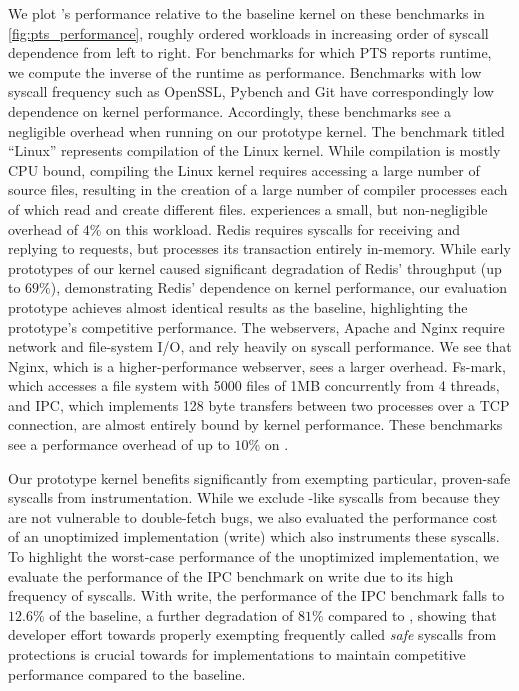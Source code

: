 \documentclass[letterpaper,twocolumn,10pt, anonymous]{article}
\begin{document}
We plot \tiktok's performance relative to the baseline kernel on
these benchmarks in \autoref{fig:pts_performance}, roughly ordered 
workloads in increasing order of syscall dependence from left to right.
For benchmarks for which PTS reports runtime, we compute the inverse 
of the runtime as performance.
Benchmarks with low syscall frequency such as OpenSSL, 
Pybench and Git have correspondingly low dependence on kernel performance.
Accordingly, these benchmarks see a negligible overhead when running 
on our prototype kernel.
The benchmark titled ``Linux'' represents compilation of the Linux kernel.
While compilation is mostly CPU bound, compiling the Linux kernel requires 
accessing a large number of source files, resulting in the creation 
of a large number of compiler processes each of which read and create 
different files. 
\tiktok experiences a small, but non-negligible overhead of $4\%$ on this workload.
Redis requires syscalls for receiving and replying to requests, but 
processes its transaction entirely in-memory. 
While early prototypes of our kernel caused significant degradation
of Redis' throughput (up to $69\%$), demonstrating Redis' dependence 
on kernel performance, 
our evaluation prototype achieves almost identical results as the baseline, 
highlighting the prototype's competitive performance.
The webservers, Apache and Nginx require network and file-system I/O, 
and rely heavily on syscall performance. 
We see that Nginx, which is a higher-performance webserver, sees a larger
overhead.
Fs-mark, which accesses a file system with 5000 files of 1MB concurrently
from 4 threads, and IPC, which implements 128 byte transfers between 
two processes over a TCP connection, are almost entirely bound by kernel 
performance. 
These benchmarks see a performance overhead of up to $10\%$ on \tiktok.

Our prototype \tiktok kernel benefits significantly from 
exempting particular, proven-safe syscalls from instrumentation.
While we exclude -like syscalls from \tiktok because they 
are not vulnerable to double-fetch bugs, we also evaluated the
performance cost of an unoptimized implementation (\tiktok{+}write)
which also instruments these syscalls.
To highlight the worst-case performance of the unoptimized implementation, 
we evaluate the performance of the IPC benchmark on \tiktok{+}write due 
to its high frequency of  syscalls.
With \tiktok{+}write, the performance of the IPC benchmark falls to 
$12.6\%$ of the baseline, a further degradation of $81\%$ compared 
to \tiktok, showing that developer effort towards properly exempting 
frequently called \emph{safe} syscalls from \tiktok protections is crucial
towards for implementations to maintain competitive performance
compared to the baseline.
\end{document}
